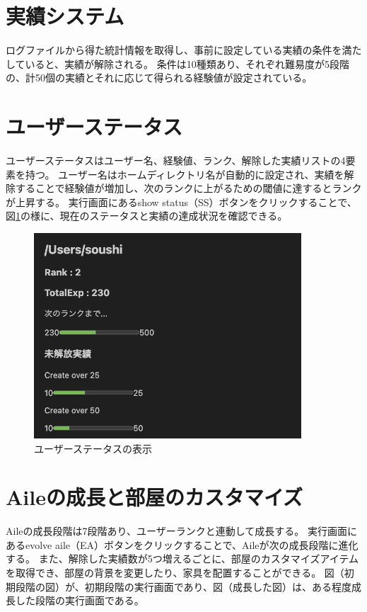 \documentclass[12pt,twoside]{jbook}
\begin{document}
\section{実績システム}
 ログファイルから得た統計情報を取得し、事前に設定している実績の条件を満たしていると、実績が解除される。
条件は10種類あり、それぞれ難易度が5段階の、計50個の実績とそれに応じて得られる経験値が設定されている。

\section{ユーザーステータス}
 ユーザーステータスはユーザー名、経験値、ランク、解除した実績リストの4要素を持つ。
ユーザー名はホームディレクトリ名が自動的に設定され、実績を解除することで経験値が増加し、次のランクに上がるための閾値に達するとランクが上昇する。
実行画面にあるshow status（SS）ボタンをクリックすることで、図\ref{fig:userStatus}の様に、現在のステータスと実績の達成状況を確認できる。

\begin{figure}[tb]
  \centering
  \includegraphics[width=10cm]{images/userStatus}
  \caption{ユーザーステータスの表示}
  \label{fig:userStatus}
\end{figure}

\section{Aileの成長と部屋のカスタマイズ}
 Aileの成長段階は7段階あり、ユーザーランクと連動して成長する。
実行画面にあるevolve aile（EA）ボタンをクリックすることで、Aileが次の成長段階に進化する。
また、解除した実績数が5つ増えるごとに、部屋のカスタマイズアイテムを取得でき、部屋の背景を変更したり、家具を配置することができる。
図（初期段階の図）が、初期段階の実行画面であり、図（成長した図）は、ある程度成長した段階の実行画面である。
\end{document}
